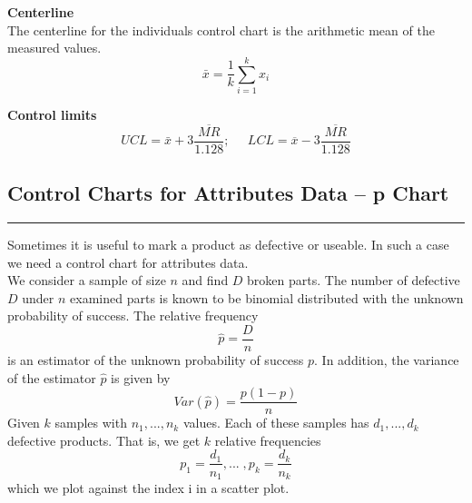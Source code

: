 \textbf{Centerline}\\
The centerline for the individuals control chart is the arithmetic mean of the measured values.
\begin{equation}
  \bar{x} = \frac{1}{k} \sum^k_{i=1} x_i
\end{equation}

\textbf{Control limits}
\begin{equation}
    UCL = \bar{x} + 3 \frac{\overline{MR}}{1.128}; \;\;\;\;\; LCL = \overline{x} - 3 \frac{\overline{MR}}{1.128}
\end{equation}

\subsection{Control Charts for Attributes Data – p Chart}
\noindent\rule[\linienAbstand]{\linewidth}{\linienDicke}
Sometimes it is useful to mark a product as defective or useable. In such a case we need a control chart for attributes data.\\

We consider a sample of size $n$ and find $D$ broken parts. The number of defective $D$ under $n$ examined parts is known to be binomial distributed with the unknown probability of success. The relative frequency
\begin{equation}
  \hat{p} = \frac{D}{n}
\end{equation}
is an estimator of the unknown probability of success $p$. In addition, the variance of the estimator $\hat{p}$ is given by
\begin{equation}
  Var(\hat{p}) = \frac{p(1-p)}{n}
\end{equation}
Given $k$ samples with $n_1,...,n_k$ values. Each of these samples has $d_1,...,d_k$ defective products. That is, we get $k$ relative frequencies
\begin{equation}
  p_1 = \frac{d_1}{n_1},...\;,p_k = \frac{d_k}{n_k}
\end{equation}
which we plot against the index i in a scatter plot.\\

